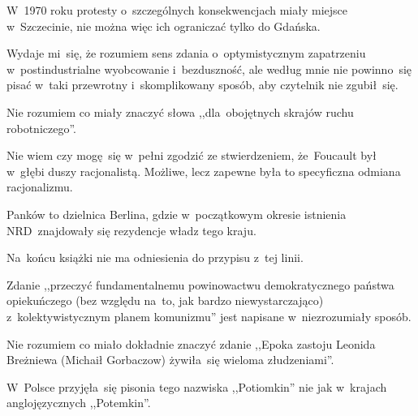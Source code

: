 \documentclass[a4paper,11pt]{article}
\begin{document}
\vspace{\spaceFour}


\start {} W~1970 roku protesty o~szczególnych
konsekwencjach miały miejsce w~Szczecinie, nie można więc ich
ograniczać tylko do Gdańska.

\vspace{\spaceFour}


\start {} Wydaje mi~się, że rozumiem sens zdania
o~optymistycznym zapatrzeniu w~postindustrialne wyobcowanie
i~bezduszność, ale według mnie nie powinno~się pisać w~taki przewrotny
i~skomplikowany sposób, aby czytelnik nie zgubił~się.

\vspace{\spaceFour}


\start {} Nie rozumiem co miały znaczyć słowa
,,dla~obojętnych skrajów ruchu robotniczego''.

\vspace{\spaceFour}


\start {} Nie wiem czy mogę~się w~pełni zgodzić ze
stwierdzeniem, że~Foucault był w~głębi duszy racjonalistą. Możliwe,
lecz zapewne była to specyficzna odmiana racjonalizmu.

\vspace{\spaceFour}


\start {} Panków to dzielnica Berlina, gdzie
w~początkowym okresie istnienia NRD~znajdowały się rezydencje władz
tego kraju.

\vspace{\spaceFour}


\start {} Na~końcu książki nie ma odniesienia do przypisu
z~tej linii.

\vspace{\spaceFour}


\start {} Zdanie ,,przeczyć fundamentalnemu
powinowactwu demokratycznego państwa opiekuńczego (bez względu na~to,
jak bardzo niewystarczająco) z~kolektywistycznym planem komunizmu''
jest napisane w~niezrozumiały sposób.

\vspace{\spaceFour}


\start {} Nie rozumiem co miało dokładnie znaczyć
zdanie ,,Epoka zastoju Leonida Breżniewa (Michaił Gorbaczow)
żywiła~się wieloma złudzeniami''.

\vspace{\spaceFour}

\start {} W~Polsce przyjęła~się pisonia tego nazwiska
,,Potiomkin'' nie jak w~krajach anglojęzycznych ,,Potemkin''.
\end{document}
